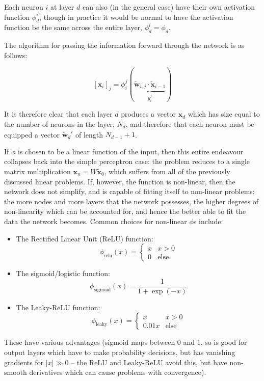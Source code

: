 \documentclass[10pt, twocolumn]{article}
\renewcommand\vec[1]{\boldsymbol{\textbf{#1}}}
\newcommand\cec[1]{\tilde{\vec{#1}}}
\begin{document}
		
		Each neuron $i$ at layer $d$ can also (in the general case) have their own activation function $\phi_d^i$, though in practice it would be normal to have the activation function be the same across the entire layer, $\phi_d^i = \phi_d$.

		The algorithm for passing the information forward through the network is as follows:

		\begin{equation}
			\left[\vec{x}_i \right]_j = \phi_i^j( \underbrace{\cec{w}_{i,j} \cdot \cec{x}_{i-1}}_{y_i^j})
		\end{equation}

		It is therefore clear that each layer $d$ produces a vector $\vec{x}_d$ which has size equal to the number of neurons in the layer, $N_d$, and therefore that each neuron must be equipped a vector ${\cec{w}_d}^i$ of length $N_{d-1}+1$. 
		
		If $\phi$ is chosen to be a linear function of the input, then this entire endeavour collapses back into the simple perceptron case: the problem reduces to a single matrix multiplication $\vec{x}_n = W \cec{x}_0$, which suffers from all of the previously discussed linear problems. If, however, the function is non-linear, then the network does not simplify, and is capable of fitting itself to non-linear problems: the more nodes and more layers that the network possesses, the higher degrees of non-linearity which can be accounted for, and hence the better able to fit the data the network becomes. Common choices for non-linear $\phi$s include:

		\begin{itemize}
			\item The Rectified Linear Unit (ReLU) function:
			$$ \phi_\text{relu}(x) = \begin{cases} x & x > 0 \\ 0 &\text{else}\end{cases}$$
			\item The sigmoid/logistic function:
			$$ \phi_\text{sigmoid}(x) = \frac{1}{1 + \exp(-x)}$$
			\item The Leaky-ReLU function:
			$$\phi_\text{leaky}(x) = 	\begin{cases} x & x > 0 \\ 0.01x &\text{else}\end{cases}$$	
		\end{itemize}
		These have various advantages (sigmoid maps between 0 and 1, so is good for output layers which have to make probability decisions, but has vanishing gradients for $|x| \gg 0$ -- the ReLU and Leaky-ReLU avoid this, but have non-smooth derivatives which can cause problems with convergence). 
\end{document}
